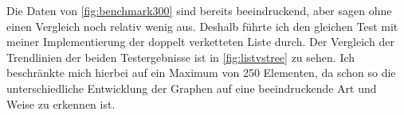 \par
Die Daten von \autoref{fig:benchmark300} sind bereits beeindruckend, aber sagen ohne einen Vergleich noch relativ wenig aus. Deshalb führte ich den gleichen Test mit meiner Implementierung der doppelt verketteten Liste durch. Der Vergleich der Trendlinien der beiden Testergebnisse ist in \autoref{fig:listvstree} zu sehen. Ich beschränkte mich hierbei auf ein Maximum von 250 Elementen, da schon so die unterschiedliche Entwicklung der Graphen auf eine beeindruckende Art und Weise zu erkennen ist.

\begin{figure}
\end{figure}

